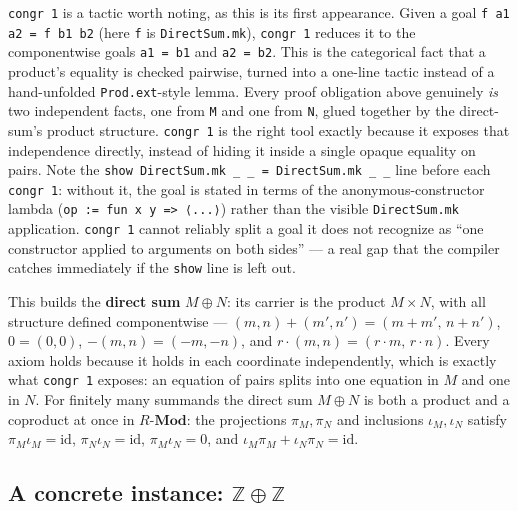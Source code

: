 \texttt{congr 1} is a tactic worth noting, as this is its first appearance. Given a goal \texttt{f a1 a2 = f b1 b2} (here \texttt{f} is \texttt{DirectSum.mk}), \texttt{congr 1} reduces it to the componentwise goals \texttt{a1 = b1} and \texttt{a2 = b2}. This is the categorical fact that a product's equality is checked pairwise, turned into a one-line tactic instead of a hand-unfolded \texttt{Prod.ext}-style lemma. Every proof obligation above genuinely \emph{is} two independent facts, one from \texttt{M} and one from \texttt{N}, glued together by the direct-sum's product structure. \texttt{congr 1} is the right tool exactly because it exposes that independence directly, instead of hiding it inside a single opaque equality on pairs. Note the \texttt{show DirectSum.mk \_\allowbreak{} \_\allowbreak{} = DirectSum.mk \_\allowbreak{} \_\allowbreak{}} line before each \texttt{congr 1}: without it, the goal is stated in terms of the anonymous-constructor lambda (\texttt{op := fun x y => ⟨...⟩}) rather than the visible \texttt{DirectSum.mk} application. \texttt{congr 1} cannot reliably split a goal it does not recognize as ``one constructor applied to arguments on both sides'' --- a real gap that the compiler catches immediately if the \texttt{show} line is left out.

\begin{mathreading}

This builds the \textbf{direct sum} \(M \oplus N\): its carrier is the product \(M \times N\), with all structure defined componentwise --- \((m,n) + (m',n') = (m+m',\, n+n')\), \(0 = (0,0)\), \(-(m,n) =
(-m,-n)\), and \(r\cdot(m,n) = (r\cdot m,\, r\cdot n)\). Every axiom holds because it holds in each coordinate independently, which is exactly what \texttt{congr 1} exposes: an equation of pairs splits into one equation in \(M\) and one in \(N\). For finitely many summands the direct sum \(M \oplus N\) is both a product and a coproduct at once in \(R\text{-}\mathbf{Mod}\): the projections \(\pi_M, \pi_N\) and inclusions \(\iota_M, \iota_N\) satisfy \(\pi_M\iota_M = \mathrm{id}\), \(\pi_N\iota_N = \mathrm{id}\), \(\pi_M\iota_N =
0\), and \(\iota_M\pi_M + \iota_N\pi_N = \mathrm{id}\).

\end{mathreading}

\begin{center}

\end{center}

\subsection{\texorpdfstring{A concrete instance: \(\mathbb{Z} \oplus \mathbb{Z}\)}{A concrete instance: \textbackslash mathbb\{Z\} \textbackslash oplus \textbackslash mathbb\{Z\}}}\label{sec:10-modules:06-direct-sums:2}

